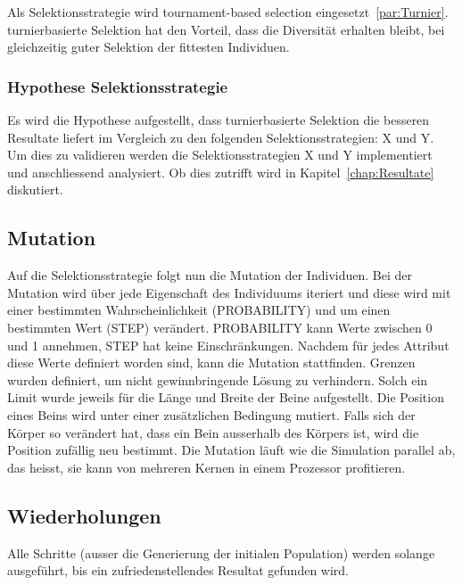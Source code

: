       Als Selektionsstrategie wird tournament-based selection eingesetzt~\ref{par:Turnier}.
      turnierbasierte Selektion hat den Vorteil, dass die Diversität erhalten bleibt,
      bei gleichzeitig guter Selektion der fittesten Individuen.

      \subsubsection{Hypothese Selektionsstrategie\label{sub:Hypothese Selektionsstrategie}}

        Es wird die Hypothese aufgestellt,
        dass turnierbasierte Selektion die besseren Resultate liefert im Vergleich zu den folgenden Selektionsstrategien: X und Y.
        Um dies zu validieren werden die Selektionsstrategien X und Y implementiert und anschliessend analysiert.
        Ob dies zutrifft wird in Kapitel~\ref{chap:Resultate} diskutiert.

    \subsection{Mutation\label{sec:Mutation}}

      Auf die Selektionsstrategie folgt nun die Mutation der Individuen.
      Bei der Mutation wird über jede Eigenschaft des Individuums iteriert und
      diese wird mit einer bestimmten Wahrscheinlichkeit (PROBABILITY) und um einen bestimmten Wert (STEP) verändert.
      PROBABILITY kann Werte zwischen 0 und 1 annehmen, STEP hat keine Einschränkungen.
      Nachdem für jedes Attribut diese Werte definiert worden sind, kann die Mutation stattfinden.
      Grenzen wurden definiert, um nicht gewinnbringende Lösung zu verhindern.
      Solch ein Limit wurde jeweils für die Länge und Breite der Beine aufgestellt.
      Die Position eines Beins wird unter einer zusätzlichen Bedingung mutiert. Falls sich der Körper so verändert hat,
      dass ein Bein ausserhalb des Körpers ist, wird die Position zufällig neu bestimmt.
      Die Mutation läuft wie die Simulation parallel ab, das heisst, sie kann von mehreren Kernen in einem Prozessor profitieren.

    \subsection{Wiederholungen}

      Alle Schritte (ausser die Generierung der initialen Population) werden solange ausgeführt,
      bis ein zufriedenstellendes Resultat gefunden wird.

